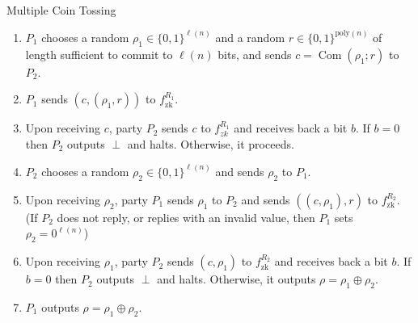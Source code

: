 \documentclass{beamer}
\begin{document}
    \begin{frame}
        \frametitle{}
    
        \begin{block}{Multiple Coin Tossing}
            \begin{enumerate}
                \item $P_{1}$ chooses a random $\rho_{1} \in\{0,1\}^{\ell(n)}$ and a random $r \in\{0,1\}^{\text {poly}(n)}$ of length sufficient to commit to $\ell(n)$ bits, and sends $c=\operatorname{Com}\left(\rho_{1} ; r\right)$ to $P_{2}$.
                \item $P_{1}$ sends $\left(c,\left(\rho_{1}, r\right)\right)$ to $f_{\mathrm{zk}}^{R_{1}}$.
                \item Upon receiving $c$, party $P_{2}$ sends $c$ to $f_{z k}^{R_{1}}$ and receives back a bit $b$. If $b=0$ then $P_{2}$ outputs $\perp$ and halts. Otherwise, it proceeds.
                \item  $P_{2}$ chooses a random $\rho_{2} \in\{0,1\}^{\ell(n)}$ and sends $\rho_{2}$ to $P_{1}$.
                \item Upon receiving $\rho_{2}$, party $P_{1}$ sends $\rho_{1}$ to $P_{2}$ and sends $\left(\left(c, \rho_{1}\right), r\right)$ to $f_{\mathrm{zk}}^{R_{2}} .$ (If $P_{2}$ does not reply, or replies with an invalid value, then $P_{1}$ sets $\rho_{2}=0^{\ell(n)}$)
                \item Upon receiving $\rho_{1}$, party $P_{2}$ sends $\left(c, \rho_{1}\right)$ to $f_{\mathrm{zk}}^{R_{2}}$ and receives back a bit $b .$ If $b=0$ then $P_{2}$ outputs $\perp$ and halts. Otherwise, it outputs $\rho=\rho_{1} \oplus \rho_{2}$.
                \item $P_{1}$ outputs $\rho=\rho_{1} \oplus \rho_{2}$.
            \end{enumerate}
            
        \end{block}
    
    \end{frame}
\end{document}
